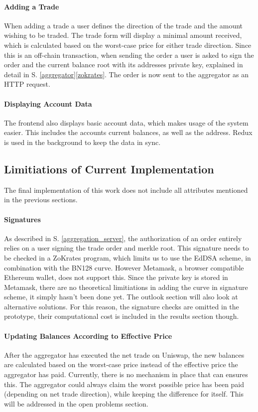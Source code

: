 \documentclass[../../thesis.tex]{subfiles}
\begin{document}
\paragraph{Adding a Trade}
When adding a trade a user defines the direction of the trade and the amount wishing to be traded. The trade form will display a minimal amount received, which is calculated based on the worst-case price for either trade direction. Since this is an off-chain transaction, when sending the order a user is asked to sign the order and the current balance root with its addresses private key, explained in detail in S. \ref{aggregator}\ref{zokrates}. The order is now sent to the aggregator as an HTTP request. 

\paragraph{Displaying Account Data}
The frontend also displays basic account data, which makes usage of the system easier. This includes the accounts current balances, as well as the address. Redux is used in the background to keep the data in sync.

\subsection{Limitiations of Current Implementation}
The final implementation of this work does not include all attributes mentioned in the previous sections. 

\paragraph{Signatures}
As described in S. \ref{aggregation_server}, the authorization of an order entirely relies on a user signing the trade order and merkle root. This signature needs to be checked in a ZoKrates program, which limits us to use the EdDSA scheme, in combination with the BN128 curve. However Metamask, a browser compatible Ethereum wallet, does not support this. Since the private key is stored in Metamask, there are no theoretical limitiations in adding the curve in signature scheme, it simply hasn't been done yet. The outlook section will also look at alternative solutions. For this reason, the signature checks are omitted in the prototype, their computational cost is included in the results section though.

\paragraph{Updating Balances According to Effective Price}
After the aggregator has executed the net trade on Uniswap, the new balances are calculated based on the worst-case price instead of the effective price the aggregator has paid. Currently, there is no mechanism in place that can ensures this. The aggregator could always claim the worst possible price has been paid (depending on net trade direction), while keeping the difference for itself. This will be addressed in the open problems section.
\end{document}
